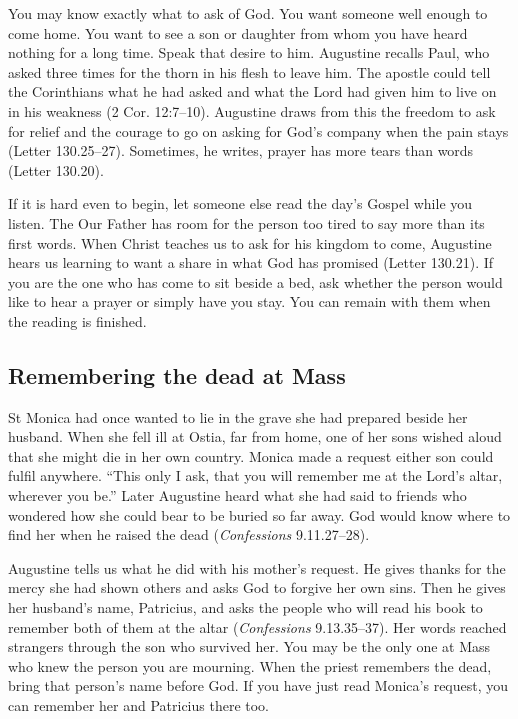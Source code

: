 You may know exactly what to ask of God. You want someone well enough
to come home. You want to see a son or daughter from whom you have
heard nothing for a long time. Speak that desire to him. Augustine recalls Paul, who asked three times for the thorn in his
flesh to leave him. The apostle could tell the Corinthians what he
had asked and what the Lord had given him to live on in his weakness
(2 Cor. 12:7--10). Augustine draws from this the freedom to ask for
relief and the courage to go on asking for God's company when the
pain stays (Letter 130.25--27). Sometimes, he writes, prayer has
more tears than words (Letter 130.20).

If it is hard even to begin, let someone else read the day's Gospel
while you listen. The Our Father has room for the person too tired to
say more than its first words. When Christ teaches us to ask for his
kingdom to come, Augustine hears us learning to want a share in what
God has promised (Letter 130.21). If you are the one who has come to
sit beside a bed, ask whether the person would like to hear a prayer
or simply have you stay. You can remain with them when the reading
is finished.

\subsection{Remembering the dead at Mass}

St Monica had once wanted to lie in the grave she had prepared beside
her husband. When she fell ill at Ostia, far from home, one of her sons
wished aloud that she might die in her own country. Monica made a
request either son could fulfil anywhere. “This only I ask, that you
will remember me at the Lord's altar, wherever you be.” Later Augustine
heard what she had said to friends who wondered how she could bear to
be buried so far away. God would know where to find her when he raised
the dead (\emph{Confessions} 9.11.27--28).

Augustine tells us what he did with his mother's request. He gives
thanks for the mercy she had shown others and asks God to forgive her
own sins. Then he gives her husband's name, Patricius, and asks the
people who will read his book to remember both of them at the altar
(\emph{Confessions} 9.13.35--37). Her words reached strangers through
the son who survived her. You may be the only one at Mass who knew the
person you are mourning. When the priest remembers the dead, bring
that person's name before God. If you have just read Monica's request,
you can remember her and Patricius there too.
